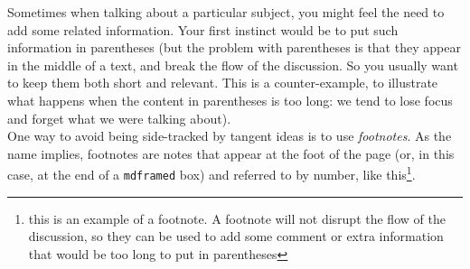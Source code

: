 Sometimes when talking about a particular subject, you might feel the need to add some related information. Your first instinct would be to put such information in parentheses (but the problem with parentheses is that they appear in the middle of a text, and break the flow of the discussion. So you usually want to keep them both short and relevant. This is a counter-example, to illustrate what happens when the content in parentheses is too long: we tend to lose focus and forget what we were talking about). \\

One way to avoid being side-tracked by tangent ideas is to use \emph{footnotes}. As the name implies, footnotes are notes that appear at the foot of the page (or, in this case, at the end of a \texttt{mdframed} box) and referred to by number, like this\footnote{this is an example of a footnote. A footnote will not disrupt the flow of the discussion, so they can be used to add some comment or extra information that would be too long to put in parentheses
}.\\